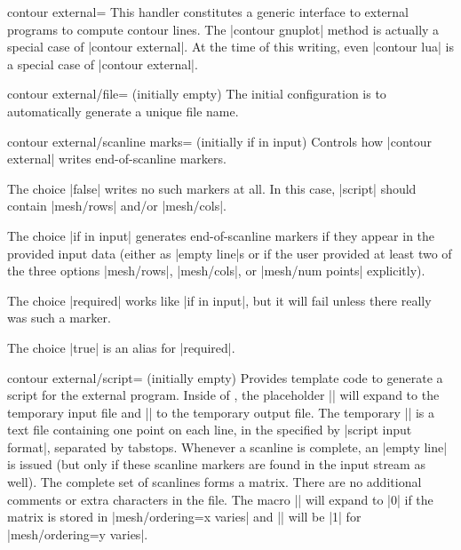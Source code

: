 {{\begin{plottype}[/pgfplots]{
    contour external=\textcolor{black}{}%
}
    This handler constitutes a generic interface to external programs to
    compute contour lines. The |contour gnuplot| method is actually a special
    case of |contour external|. At the time of this writing, even |contour lua| is a special case of |contour external|.

    \begin{pgfplotskey}{contour external/file= (initially empty)}
        The initial configuration is to automatically generate a unique file name.
    \end{pgfplotskey}

    \begin{pgfplotskey}{contour external/scanline marks= (initially if in input)}
        Controls how |contour external| writes end-of-scanline markers.

        The choice |false| writes no such markers at all. In this case,
        |script| should contain |mesh/rows| and/or |mesh/cols|.

        The choice |if in input| generates end-of-scanline markers if they
        appear in the provided input data (either as |empty line|s or if the
        user provided at least two of the three options |mesh/rows|,
        |mesh/cols|, or |mesh/num points| explicitly).

        The choice |required| works like |if in input|, but it will fail unless
        there really was such a marker.

        The choice |true| is an alias for |required|.
    \end{pgfplotskey}

    \begin{pgfplotskey}{contour external/script= (initially empty)}
        Provides template code to generate a script for the external program.
        Inside of , the placeholder |\infile|
        will expand to the temporary input file and |\outfile| to the temporary
        output file. The temporary |\infile| is a text file containing one
        point on each line, in the specified by |script input format|, separated by tabstops.
        Whenever a scanline is complete, an |empty line| is issued (but only if
        these scanline markers are found in the input stream as well). The
        complete set of scanlines forms a matrix. There are no additional
        comments or extra characters in the file. The macro |\ordering| will
        expand to |0| if the matrix is stored in |mesh/ordering=x varies| and
        |\ordering| will be |1| for |mesh/ordering=y varies|.


\end{pgfplotskey}
\end{plottype}}}
